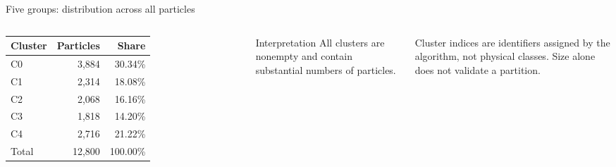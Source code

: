 \documentclass[aspectratio=169,11pt]{beamer}
\begin{document}
\begin{frame}{Five groups: distribution across all particles}
  \begin{columns}[T,onlytextwidth]
      \begin{table}
        \centering\large
        \begin{tabular}{@{}lrr@{}}
          \toprule
          Cluster & Particles & Share \\
          \midrule
          C0 & 3,884 & 30.34\% \\
          C1 & 2,314 & 18.08\% \\
          C2 & 2,068 & 16.16\% \\
          C3 & 1,818 & 14.20\% \\
          C4 & 2,716 & 21.22\% \\
          \midrule
          Total & 12,800 & 100.00\% \\
          \bottomrule
        \end{tabular}
      \end{table}
      \begin{block}{Interpretation}
        All clusters are nonempty and contain substantial numbers of particles.
      \end{block}
      \small Cluster indices are identifiers assigned by the algorithm, not physical classes. Size alone does not validate a partition.
  \end{columns}
\end{frame}
\end{document}
